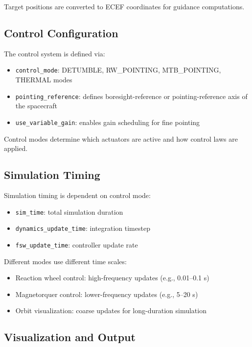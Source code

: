 Target positions are converted to ECEF coordinates for guidance computations.

\subsection{Control Configuration}

The control system is defined via:

\begin{itemize}
	\item \texttt{control\_mode}: DETUMBLE, RW\_POINTING, MTB\_POINTING, THERMAL modes
	\item \texttt{pointing\_reference}: defines boresight-reference or pointing-reference axis of the spacecraft
	\item \texttt{use\_variable\_gain}: enables gain scheduling for fine pointing
\end{itemize}

Control modes determine which actuators are active and how control laws are applied.

\subsection{Simulation Timing}

Simulation timing is dependent on control mode:

\begin{itemize}
	\item \texttt{sim\_time}: total simulation duration
	\item \texttt{dynamics\_update\_time}: integration timestep
	\item \texttt{fsw\_update\_time}: controller update rate
\end{itemize}

Different modes use different time scales:

\begin{itemize}
	\item Reaction wheel control: high-frequency updates (e.g., 0.01–0.1 s)
	\item Magnetorquer control: lower-frequency updates (e.g., 5–20 s)
	\item Orbit visualization: coarse updates for long-duration simulation
\end{itemize}

\subsection{Visualization and Output}

